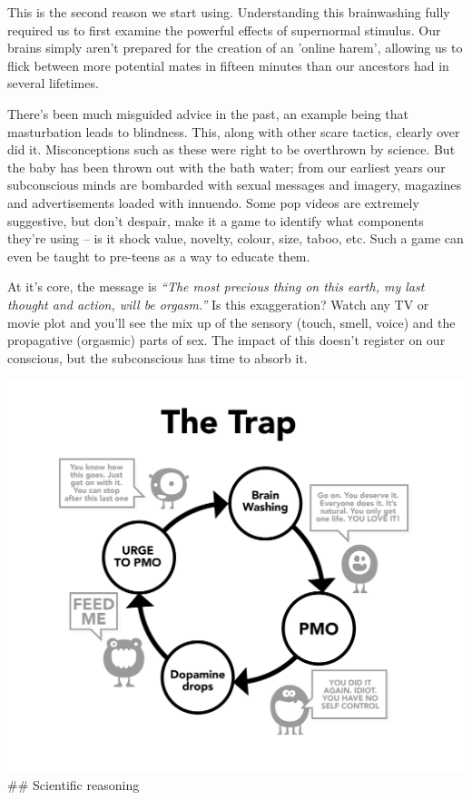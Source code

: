 \documentclass[
]{book}
\begin{document}
This is the second reason we start using. Understanding this brainwashing fully required us to first examine the powerful effects of supernormal stimulus. Our brains simply aren't prepared for the creation of an 'online harem', allowing us to flick between more potential mates in fifteen minutes than our ancestors had in several lifetimes.

There's been much misguided advice in the past, an example being that masturbation leads to blindness. This, along with other scare tactics, clearly over did it. Misconceptions such as these were right to be overthrown by science. But the baby has been thrown out with the bath water; from our earliest years our subconscious minds are bombarded with sexual messages and imagery, magazines and advertisements loaded with innuendo. Some pop videos are extremely suggestive, but don't despair, make it a game to identify what components they're using -- is it shock value, novelty, colour, size, taboo, etc. Such a game can even be taught to pre-teens as a way to educate them.

At it's core, the message is \emph{``The most precious thing on this earth, my last thought and action, will be orgasm.''} Is this exaggeration? Watch any TV or movie plot and you'll see the mix up of the sensory (touch, smell, voice) and the propagative (orgasmic) parts of sex. The impact of this doesn't register on our conscious, but the subconscious has time to absorb it.

\includegraphics{images/trap.png}
\#\# Scientific reasoning
\end{document}
